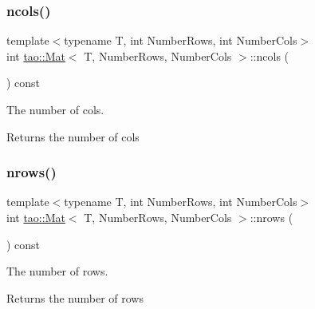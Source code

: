 \subsubsection{\texorpdfstring{ncols()}{ncols()}}
{\footnotesize\ttfamily template$<$typename T, int Number\+Rows, int Number\+Cols$>$ \\
int \mbox{\hyperlink{classtao_1_1_mat}{tao\+::\+Mat}}$<$ T, Number\+Rows, Number\+Cols $>$\+::ncols (\begin{DoxyParamCaption}{ }\end{DoxyParamCaption}) const\hspace{0.3cm}{\ttfamily [inline]}}



The number of cols. 

\begin{DoxyReturn}{Returns}
the number of cols 
\end{DoxyReturn}
\mbox{\label{classtao_1_1_mat_a0ecf2fe071bee0ba5de27b5437c06e38}} 
\subsubsection{\texorpdfstring{nrows()}{nrows()}}
{\footnotesize\ttfamily template$<$typename T, int Number\+Rows, int Number\+Cols$>$ \\
int \mbox{\hyperlink{classtao_1_1_mat}{tao\+::\+Mat}}$<$ T, Number\+Rows, Number\+Cols $>$\+::nrows (\begin{DoxyParamCaption}{ }\end{DoxyParamCaption}) const\hspace{0.3cm}{\ttfamily [inline]}}



The number of rows. 

\begin{DoxyReturn}{Returns}
the number of rows 
\end{DoxyReturn}
\mbox{\label{classtao_1_1_mat_a9b10422fcba8efcdf1965ebbc9134984}} 

